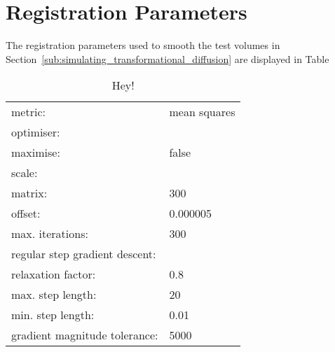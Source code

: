 \appendix
\dblspace

\chapter{Registration Parameters} %
\label{cha:registration_parameters}
  The registration parameters used to smooth the test volumes in Section~\ref{sub:simulating_transformational_diffusion} are displayed in Table
  
  \begin{table}[h]
    \centering
    \begin{tabular}{|ll|}
      \hline
      metric: & mean squares \\
      \multicolumn{2}{|l|}{optimiser:} \\
      \quad maximise: & false\\
      \multicolumn{2}{|l|}{\quad scale:} \\
      \quad\quad matrix: & 300 \\
      \quad\quad offset: & 0.000005 \\
      \quad max. iterations: & 300 \\
      \multicolumn{2}{|l|}{\quad regular step gradient descent:} \\
      \quad\quad relaxation factor: & 0.8 \\
      \quad\quad max. step length: & 20 \\
      \quad\quad min. step length: & 0.01 \\
      \quad\quad gradient magnitude tolerance: & 5000 \\
      \hline
    \end{tabular}
    
    \caption{Hey!}
  \end{table}
  
